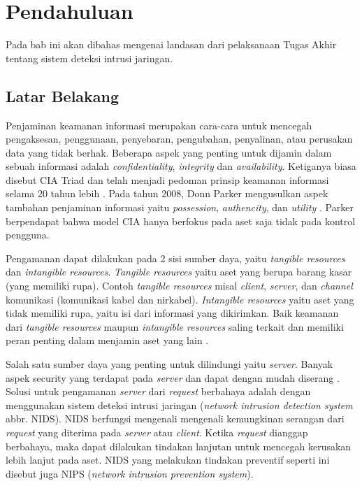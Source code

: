 \chapter{Pendahuluan}

  Pada bab ini akan dibahas mengenai landasan dari pelaksanaan Tugas Akhir tentang sistem deteksi intrusi jaringan.

\section{Latar Belakang}

  Penjaminan keamanan informasi merupakan cara-cara untuk mencegah pengaksesan, penggunaan, penyebaran, pengubahan, penyalinan, atau perusakan data yang tidak berhak. Beberapa aspek yang penting untuk dijamin dalam sebuah informasi adalah \emph{confidentiality}, \emph{integrity} dan \emph{availability}. Ketiganya biasa disebut CIA Triad dan telah menjadi pedoman prinsip keamanan informasi selama 20 tahun lebih \parencite{perrin2008}. Pada tahun 2008, Donn Parker mengusulkan aspek tambahan penjaminan informasi yaitu \emph{possession}, \emph{authencity}, dan \emph{utility} \parencite{parker1998}. Parker berpendapat bahwa model CIA hanya berfokus pada aset saja tidak pada kontrol pengguna.

  Pengamanan dapat dilakukan pada 2 sisi sumber daya, yaitu \emph{tangible resources} dan \emph{intangible resources}. \emph{Tangible resources} yaitu aset yang berupa barang kasar (yang memiliki rupa). Contoh \emph{tangible resources} misal \emph{client}, \emph{server}, dan \emph{channel} komunikasi (komunikasi kabel dan nirkabel). \emph{Intangible resources} yaitu aset yang tidak memiliki rupa, yaitu isi dari informasi yang dikirimkan. Baik keamanan dari \emph{tangible resources} maupun \emph{intangible resources} saling terkait dan memiliki peran penting dalam menjamin aset yang lain \parencite{kizza2015}.

  Salah satu sumber daya yang penting untuk dilindungi yaitu \emph{server}. Banyak aspek security yang terdapat pada \emph{server} dan dapat dengan mudah diserang \parencite{owasp2013}. Solusi untuk pengamanan \emph{server} dari \emph{request} berbahaya adalah dengan menggunakan sistem deteksi intrusi jaringan (\emph{network intrusion detection system} abbr. NIDS). NIDS berfungsi mengenali mengenali kemungkinan serangan dari \emph{request} yang diterima pada \emph{server} atau \emph{client}. Ketika \emph{request} dianggap berbahaya, maka dapat dilakukan tindakan lanjutan untuk mencegah kerusakan lebih lanjut pada aset. NIDS yang melakukan tindakan preventif seperti ini disebut juga NIPS (\emph{network intrusion prevention system}).

